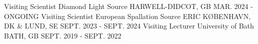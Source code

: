 \begin{cventries}
	\cventry
	{Visiting Scientist}
	{Diamond Light Source}
	{HARWELL-DIDCOT, GB}
	{MAR. 2024 - ONGOING}
	\cventry
	{Visiting Scientist}
	{European Spallation Source ERIC}
	{K\O BENHAVN, DK \& LUND, SE}
	{SEPT. 2023 - SEPT. 2024}
	\cventry
	{Visiting Lecturer}
	{University of Bath}
	{BATH, GB}
	{SEPT. 2019 - SEPT. 2022}
\end{cventries}
